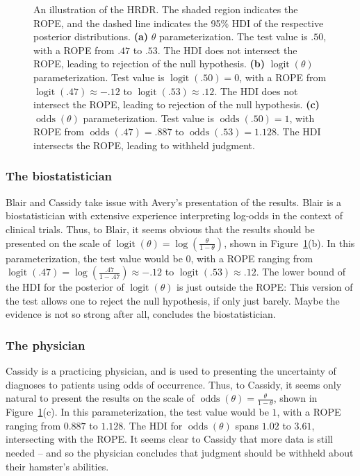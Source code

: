 \documentclass[9pt,twocolumn,twoside]{cidlab-draft}\templatetype{cidlab-invited}
\newcommand{\hdr}{HRDR}
\DeclareMathOperator*{\oddss}{odds}
\DeclareMathOperator*{\logit}{logit}
\begin{document}
\begin{figure}[tb]
    \caption{An illustration of the \hdr{}. The shaded region indicates the ROPE, and the dashed line indicates the 95\% HDI of the respective posterior distributions. \textbf{(a)} $\theta$ parameterization. The test value is $.50$, with a ROPE from $.47$ to $.53$. The HDI does not intersect the ROPE, leading to rejection of the null hypothesis. \textbf{(b)} $\logit(\theta)$ parameterization. Test value is $\logit(.50)=0$, with a ROPE from $\logit(.47)\approx-.12$ to $\logit(.53)\approx.12$. The HDI does not intersect the ROPE, leading to rejection of the null hypothesis. \textbf{(c)} $\oddss(\theta)$ parameterization. Test value is $\oddss(.50)=1$, with ROPE from $\oddss(.47)=.887$ to $\oddss(.53)=1.128$. The HDI intersects the ROPE, leading to withheld judgment.}
    \label{fig:ropes}
\end{figure}

\subsubsection{The biostatistician} Blair and Cassidy take issue with Avery's presentation of the results. Blair is a biostatistician with extensive experience interpreting log-odds in the context of clinical trials. Thus, to Blair, it seems obvious that the results should be presented on the scale of $\logit(\theta)=\log\left(\frac{\theta}{1-\theta}\right)$, shown in Figure~\ref{fig:ropes}(b). In this parameterization, the test value would be 0, with a ROPE ranging from $\logit(.47)=\log\left(\frac{.47}{1-.47}\right)\approx-.12$ to $\logit(.53)\approx.12$. The lower bound of the HDI for the posterior of $\logit(\theta)$ is just outside the ROPE: This version of the test allows one to reject the null hypothesis, if only just barely. Maybe the evidence is not so strong after all, concludes the biostatistician. 

\subsubsection{The physician} Cassidy is a practicing physician, and is used to presenting the uncertainty of diagnoses to patients using odds of occurrence. Thus, to Cassidy, it seems only natural to present the results on the scale of $\oddss(\theta)=\frac{\theta}{1-\theta}$, shown in Figure~\ref{fig:ropes}(c). In this parameterization, the test value would be $1$, with a ROPE ranging from $0.887$ to $1.128$. The HDI for $\oddss(\theta)$ spans $1.02$ to $3.61$, intersecting with the ROPE.  
It seems clear to Cassidy that more data is still needed -- and so the physician concludes that judgment should be withheld about their hamster's abilities.\\
\end{document}

